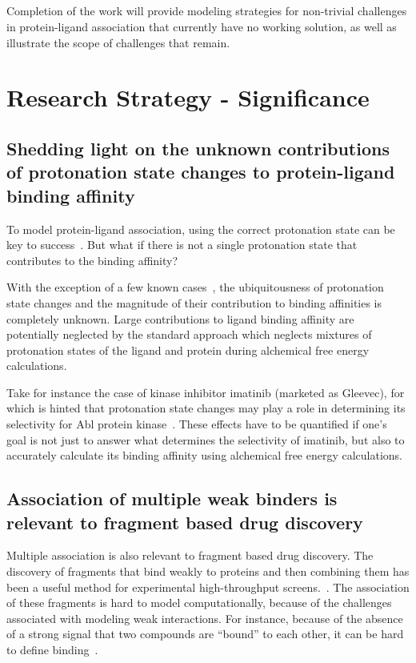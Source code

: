 \documentclass[10pt,final]{article}
\newif\ifinstr
\newcommand{\instr}[1]{\ifdraft{\ifinstr {\color{cyan}\emph{#1}} \fi}{}}
\begin{document}
\subsection*{} %

Completion of the work will provide modeling strategies for non-trivial challenges in protein-ligand association that currently have no working solution, as well as illustrate the scope of challenges that remain.

\section*{Research Strategy - Significance}
\instr{General background, significance in terms of basic science and disease relevance.}


\subsection*{Shedding light on the unknown contributions of protonation state changes to protein-ligand binding affinity}
To model protein-ligand association, using the correct protonation state can be key to success~\cite{Polgar2005a,Wittayanarakul2008a}. But what if there is not a single protonation state that contributes to the binding affinity?

With the exception of a few known cases~\cite{Aleksandrov2007a,Czodrowski2007a,Steuber2007a,Czodrowski2007b}, the ubiquitousness of protonation state changes and the magnitude of their contribution to binding affinities is completely unknown. Large contributions to ligand binding affinity are potentially neglected by the standard approach which neglects mixtures of protonation states of the ligand and protein during alchemical free energy calculations.

Take for instance the case of kinase inhibitor imatinib (marketed as Gleevec), for which is hinted that protonation state changes may play a role in determining its selectivity for Abl protein kinase~\cite{Lin2013a}. These effects have to be quantified if one's goal is not just to answer what determines the selectivity of imatinib, but also to accurately calculate its binding affinity using alchemical free energy calculations.

 

\subsection*{Association of multiple weak binders is relevant to fragment based drug discovery}
Multiple association is also relevant to fragment based drug discovery. The discovery of fragments that bind weakly to proteins and then combining them has been a useful method for experimental high-throughput screens.~\cite{Hajduk2007a}. The association of these fragments is hard to model computationally, because of the challenges associated with modeling weak interactions. For instance, because of the absence of a strong signal that two compounds are ``bound'' to each other, it can be hard to define binding~\cite{Gilson1997a}. 
\end{document}
